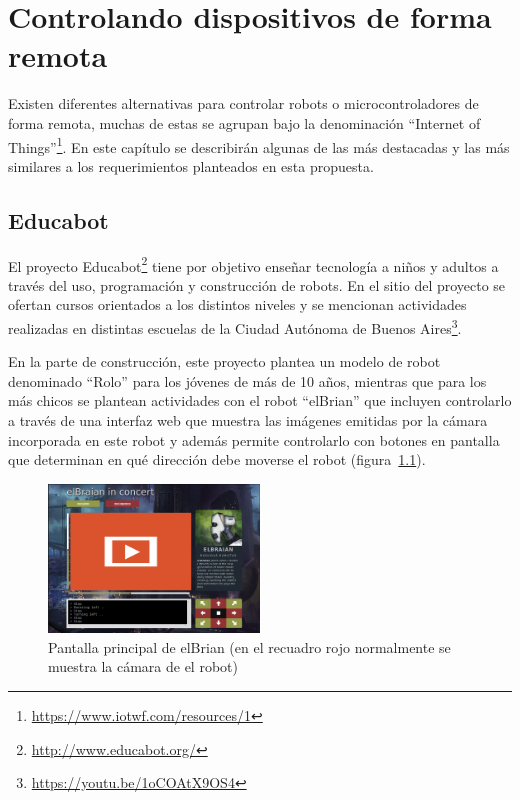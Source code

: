\chapter{Controlando dispositivos de forma remota}\label{cha:arte}

Existen diferentes alternativas para controlar robots o microcontroladores
de forma remota, muchas de estas se agrupan bajo la denominación
``Internet of Things''\footnote{\url{https://www.iotwf.com/resources/1}}.
En este capítulo se describirán algunas de las
más destacadas y las más similares a los requerimientos planteados en esta
propuesta.



\section{Educabot}
El proyecto Educabot\footnote{\url{http://www.educabot.org/}} tiene por
objetivo enseñar tecnología a niños y adultos a través
del uso, programación y construcción de robots. En el sitio del proyecto se ofertan cursos orientados a los distintos niveles y se mencionan actividades realizadas en distintas escuelas de la Ciudad Autónoma de Buenos
Aires\footnote{\url{https://youtu.be/1oCOAtX9OS4}}.


En la parte de construcción, este proyecto plantea un modelo de robot
denominado
``Rolo'' para los jóvenes de más de 10 años, mientras que para los más chicos
se plantean actividades con el robot ``elBrian'' que incluyen
controlarlo a través de una interfaz web que muestra las imágenes emitidas
por la cámara incorporada en este robot y además permite controlarlo con
botones en pantalla que determinan en qué dirección debe moverse el robot
(figura~\ref{fig:elbrian}).

\begin{figure}
    \centering
    \includegraphics[width=0.5\textwidth]{figures/elbrian-1}
    \caption{Pantalla principal de elBrian (en el recuadro rojo normalmente
        se muestra la cámara de el robot)}
    \label{fig:elbrian}
\end{figure}

